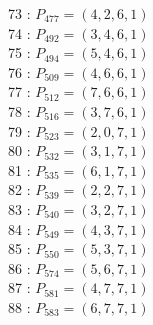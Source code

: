 \documentclass{article}
\begin{document}
{\begin{multicols}{3}
73 : $P_{477}=( 4, 2, 6, 1 )$\\
74 : $P_{492}=( 3, 4, 6, 1 )$\\
75 : $P_{494}=( 5, 4, 6, 1 )$\\
76 : $P_{509}=( 4, 6, 6, 1 )$\\
77 : $P_{512}=( 7, 6, 6, 1 )$\\
78 : $P_{516}=( 3, 7, 6, 1 )$\\
79 : $P_{523}=( 2, 0, 7, 1 )$\\
80 : $P_{532}=( 3, 1, 7, 1 )$\\
81 : $P_{535}=( 6, 1, 7, 1 )$\\
82 : $P_{539}=( 2, 2, 7, 1 )$\\
83 : $P_{540}=( 3, 2, 7, 1 )$\\
84 : $P_{549}=( 4, 3, 7, 1 )$\\
85 : $P_{550}=( 5, 3, 7, 1 )$\\
86 : $P_{574}=( 5, 6, 7, 1 )$\\
87 : $P_{581}=( 4, 7, 7, 1 )$\\
88 : $P_{583}=( 6, 7, 7, 1 )$\\
\end{multicols}


%


%


}%
\end{document}

